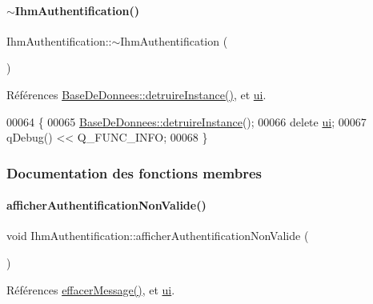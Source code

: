 \paragraph{\texorpdfstring{$\sim$\+Ihm\+Authentification()}{~IhmAuthentification()}}
{\footnotesize\ttfamily Ihm\+Authentification\+::$\sim$\+Ihm\+Authentification (\begin{DoxyParamCaption}{ }\end{DoxyParamCaption})}



Références \hyperlink{class_base_de_donnees_a457401c0816b888c77ce915997545f4e}{Base\+De\+Donnees\+::detruire\+Instance()}, et \hyperlink{class_ihm_authentification_a2bab782e7f65474f2817c3916ded9d18}{ui}.


\begin{DoxyCode}
00064 \{
00065     \hyperlink{class_base_de_donnees_a457401c0816b888c77ce915997545f4e}{BaseDeDonnees::detruireInstance}();
00066     \textcolor{keyword}{delete} \hyperlink{class_ihm_authentification_a2bab782e7f65474f2817c3916ded9d18}{ui};
00067     qDebug() << Q\_FUNC\_INFO;
00068 \}
\end{DoxyCode}


\subsubsection{Documentation des fonctions membres}
\mbox{\label{class_ihm_authentification_a91a8934658e317870fb6b931608824db}} 
\paragraph{\texorpdfstring{afficher\+Authentification\+Non\+Valide()}{afficherAuthentificationNonValide()}}
{\footnotesize\ttfamily void Ihm\+Authentification\+::afficher\+Authentification\+Non\+Valide (\begin{DoxyParamCaption}{ }\end{DoxyParamCaption})\hspace{0.3cm}{\ttfamily [private]}}



Références \hyperlink{class_ihm_authentification_a67dcacabc50a01245badd2d9268253a4}{effacer\+Message()}, et \hyperlink{class_ihm_authentification_a2bab782e7f65474f2817c3916ded9d18}{ui}.



